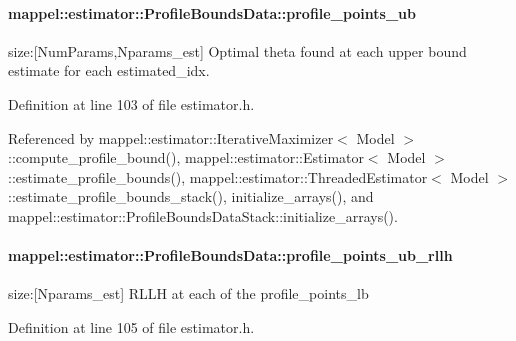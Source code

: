 \paragraph[{\texorpdfstring{profile\+\_\+points\+\_\+ub}{profile_points_ub}}]{ mappel\+::estimator\+::\+Profile\+Bounds\+Data\+::profile\+\_\+points\+\_\+ub}\hypertarget{structmappel_1_1estimator_1_1ProfileBoundsData_a51335985679f314252bac9a681e5ee4d}{}\label{structmappel_1_1estimator_1_1ProfileBoundsData_a51335985679f314252bac9a681e5ee4d}


size\+:\mbox{[}Num\+Params,Nparams\+\_\+est\mbox{]} Optimal theta found at each upper bound estimate for each estimated\+\_\+idx. 



Definition at line 103 of file estimator.\+h.



Referenced by mappel\+::estimator\+::\+Iterative\+Maximizer$<$ Model $>$\+::compute\+\_\+profile\+\_\+bound(), mappel\+::estimator\+::\+Estimator$<$ Model $>$\+::estimate\+\_\+profile\+\_\+bounds(), mappel\+::estimator\+::\+Threaded\+Estimator$<$ Model $>$\+::estimate\+\_\+profile\+\_\+bounds\+\_\+stack(), initialize\+\_\+arrays(), and mappel\+::estimator\+::\+Profile\+Bounds\+Data\+Stack\+::initialize\+\_\+arrays().

\paragraph[{\texorpdfstring{profile\+\_\+points\+\_\+ub\+\_\+rllh}{profile_points_ub_rllh}}]{ mappel\+::estimator\+::\+Profile\+Bounds\+Data\+::profile\+\_\+points\+\_\+ub\+\_\+rllh}\hypertarget{structmappel_1_1estimator_1_1ProfileBoundsData_abaf20418fe819719e7958936e429682e}{}\label{structmappel_1_1estimator_1_1ProfileBoundsData_abaf20418fe819719e7958936e429682e}


size\+:\mbox{[}Nparams\+\_\+est\mbox{]} R\+L\+LH at each of the profile\+\_\+points\+\_\+lb 



Definition at line 105 of file estimator.\+h.



